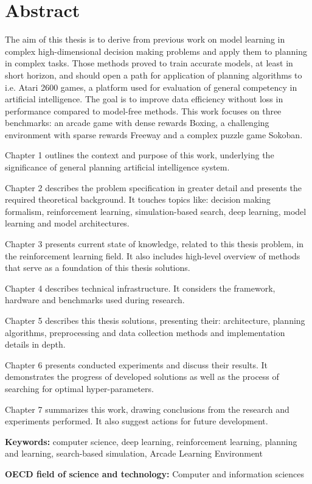 \section*{Abstract}

The aim of this thesis is to derive from previous work on model learning in complex high-dimensional decision making problems and apply them to planning in complex tasks. Those methods proved to train accurate models, at least in short horizon, and should open a path for application of planning algorithms to i.e. Atari 2600 games, a platform used for evaluation of general competency in artificial intelligence. The goal is to improve data efficiency without loss in performance compared to model-free methods. This work focuses on three benchmarks: an arcade game with dense rewards Boxing, a challenging environment with sparse rewards Freeway and a complex puzzle game Sokoban.

Chapter 1 outlines the context and purpose of this work, underlying the significance of general planning artificial intelligence system. 

Chapter 2 describes the problem specification in greater detail and presents the required theoretical background. It touches topics like: decision making formalism, reinforcement learning, simulation-based search, deep learning, model learning and model architectures.

Chapter 3 presents current state of knowledge, related to this thesis problem, in the reinforcement learning field. It also includes high-level overview of methods that serve as a foundation of this thesis solutions.

Chapter 4 describes technical infrastructure. It considers the framework, hardware and benchmarks used during research.

Chapter 5 describes this thesis solutions, presenting their: architecture, planning algorithms, preprocessing and data collection methods and implementation details in depth.

Chapter 6 presents conducted experiments and discuss their results. It demonstrates the progress of developed solutions as well as the process of searching for optimal hyper-parameters.

Chapter 7 summarizes this work, drawing conclusions from the research and experiments performed. It also suggest actions for future development.

\vspace{1cm}
\noindent
\textbf{Keywords:} computer science, deep learning, reinforcement learning, planning and learning, search-based simulation, Arcade Learning Environment

\vspace{0.5cm}
\noindent
\textbf{OECD field of science and technology:} Computer and information sciences
